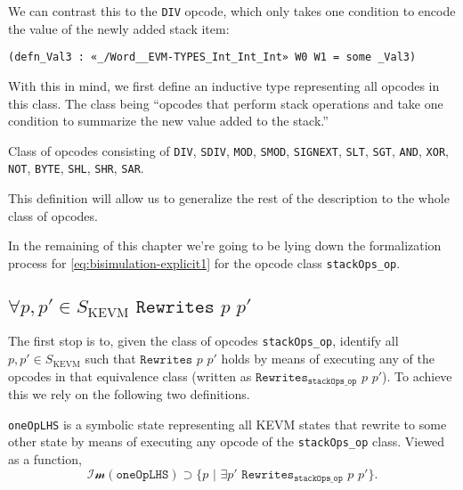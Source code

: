 We can contrast this to the \texttt{DIV} opcode, which only takes one condition
to encode the value of the newly added stack item:
\begin{verbatim}
(defn_Val3 : «_/Word__EVM-TYPES_Int_Int_Int» W0 W1 = some _Val3)
\end{verbatim}

With this in mind, we first define an inductive type representing all opcodes in
this class. The class being ``opcodes that perform stack operations and take one
condition to summarize the new value added to the stack.''

\begin{definition}[stackOps_op]\label{def:OneOp.stackOps}
\leanok
Class of opcodes consisting of
\texttt{DIV}, \texttt{SDIV}, \texttt{MOD}, \texttt{SMOD}, \texttt{SIGNEXT},
\texttt{SLT}, \texttt{SGT}, \texttt{AND}, \texttt{XOR}, \texttt{NOT},
\texttt{BYTE}, \texttt{SHL}, \texttt{SHR}, \texttt{SAR}.
\end{definition}

This definition will allow us to generalize the rest of the description to the
whole class of opcodes.

In the remaining of this chapter we're going to be lying down the formalization
process for \ref{eq:bisimulation-explicit1} for the opcode class
\texttt{stackOps_op}.

\subsection{$\forall p, p'\in S_{\text{KEVM}}\,\, \texttt{Rewrites}\,\, p \,\, p'$}

The first stop is to, given the class of opcodes \texttt{stackOps_op},
identify all $p, p'\in S_{\text{KEVM}}$ such that $\texttt{Rewrites}\,\, p \,\,
p'$ holds by means of executing any of the opcodes in that equivalence class
(written as $\texttt{Rewrites}_{\texttt{stackOps_op}}\,\, p \,\, p'$).
To achieve this we rely on the following two definitions.

\begin{definition}[oneOpLHS]\label{def:oneOpLHS}
\leanok{}

\texttt{oneOpLHS} is a symbolic state representing all KEVM states that
rewrite to some other state by means of executing any opcode of the
\texttt{stackOps_op} class. Viewed as a
function, $$\mathcal{Im}(\texttt{oneOpLHS}) \supset \{p\,\, |\,\, \exists
p'\,\,\texttt{Rewrites}_{\texttt{stackOps_op}}\,\, p \,\, p'\}.$$

\end{definition}

